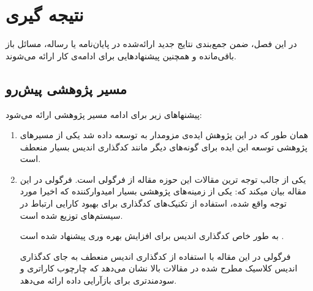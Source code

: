 \chapter{نتیجه گیری}
در این فصل، ضمن جمع‌بندی نتایج جدید ارائه‌شده در پایان‌نامه یا رساله،
مسائل باز باقی‌مانده و همچنین پیشنهادهایی برای ادامه‌ی کار ارائه می‌شوند.


\section{
مسیر پژوهشی پیش‌رو
}
پیشنهاهای زیر برای ادامه مسیر پژوهشی ارائه می‌شود:
\begin{enumerate}
	\item 
	همان طور که در این پژوهش ایده‌ی مزومدار به 
	\picod
	توسعه داده شد یکی از مسیرهای پژوهشی توسعه این ایده برای گونه‌های دیگر مانند کدگذاری اندیس بسیار منعطف است.
	\item 
	یکی از جالب توجه ترین مقالات این حوزه مقاله
	\cite{datashuf}
	از فرگولی است. فرگولی در این مقاله بیان میکند که: یکی از زمینه‌های پژوهشی بسیار امیدوارکننده که اخیرا مورد توجه واقع شده، استفاده از تکنیک‌های کدگذاری برای بهبود کارایی ارتباط در سیستم‌های توزیع شده است.
	\cite{Li2015CodedM, 7841903, 8002642, 8051074}
	
	به طور خاص کدگذاری اندیس برای افزایش بهره وری 
	پیشنهاد شده است
	\cite{8002642, 8051074}
	. 

فرگولی در این مقاله با استفاده از کدگذاری اندیس منعطف به جای کدگذاری اندیس کلاسیک مطرح شده در مقالات بالا نشان می‌دهد که 
\picod
چارچوب کاراتری و سودمندتری برای بازآرایی داده ارائه می‌دهد.


\end{enumerate}
